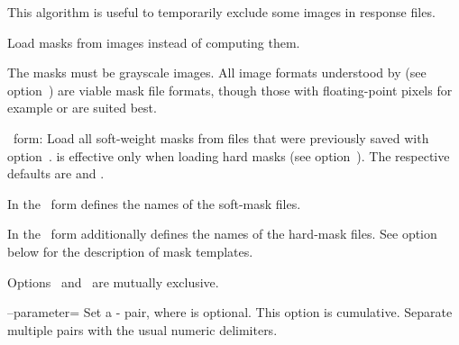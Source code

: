 \begin{codelist}
\begin{codelist}
    This algorithm is useful to temporarily exclude some images in response files.
  \end{codelist}


\ifenfuse
  \label{opt:load-masks}%
  \item[\itempar{--load-masks~\textrm{(\oldstylefirst~form)}
      \\ --load-masks=\metavar{SOFT-MASK-TEMPLATE}~\textrm{(\oldstylesecond~form)}
      \\ --load-masks=\metavar{SOFT-MASK-TEMPLATE}:\feasiblebreak
      \metavar{HARD-MASK-TEMPLATE}~\textrm{(\oldstylethird~form)}}]\itemend
    Load masks from images instead of computing them.

    The masks must be grayscale images.  All image formats understood by \App{} (see
    option~) are viable mask
    file formats, though those with floating-point pixels for example  or
     are suited best.

    \begin{sloppypar}
      \oldstylefirst~form: Load all soft-weight masks from files that were previously saved with
      option~.  
      is effective only when loading hard masks (see
      option~).  The respective defaults are
      \mbox{} and
      \mbox{}.

      In the \oldstylesecond~form  defines the names of
      the soft-mask files.

      In the \oldstylethird~form  additionally defines the
      names of the hard-mask files.  See
      option~ below for the description of
      mask templates.
    \end{sloppypar}

    Options~ and~ are mutually exclusive.
\fi


  \label{opt:parameter}%
\item[--parameter=\metavar{KEY}\optional{=\metavar{VALUE}}\optional{:\dots}]\itemend
  Set a - pair, where  is optional.  This option is
  cumulative.  Separate multiple pairs with the usual numeric delimiters.


\end{codelist}
